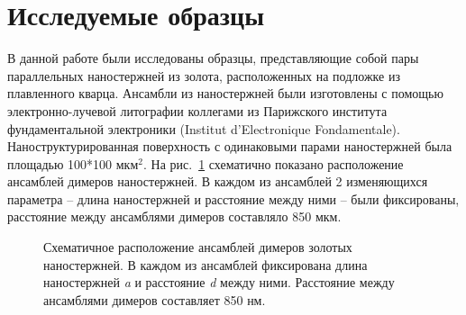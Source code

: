 \section{Исследуемые образцы}

В данной работе были исследованы образцы, представляющие собой пары параллельных наностержней из золота, расположенных на подложке из плавленного кварца. Ансамбли из наностержней были изготовлены с помощью  электронно-лучевой литографии коллегами из Парижского института фундаментальной электроники (Institut d'Electronique Fondamentale). Наноструктурированная поверхность с одинаковыми парами наностержней была площадью 100*100 мкм$ ^2 $.
На рис.~\ref{img:sample} схематично показано расположение ансамблей димеров наностержней. В каждом из ансамблей 2 изменяющихся параметра -- длина наностержней и расстояние между ними -- были фиксированы, расстояние между ансамблями димеров составляло 850 мкм. 
\begin{figure}[!h]
\caption{Схематичное расположение ансамблей димеров золотых наностержней. В каждом из ансамблей фиксирована длина наностержней \textit{a} и расстояние \textit{d} между ними. Расстояние между ансамблями димеров составляет 850 нм.}
\label{img:sample}
\end{figure}

